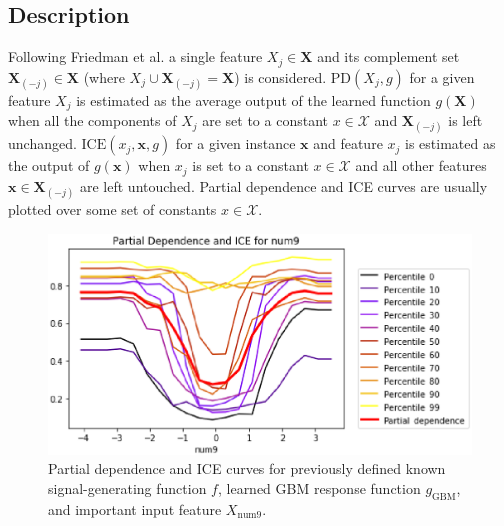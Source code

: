 \documentclass[sigconf, review]{acmart}
\begin{document}
\subsection{Description}
	
Following Friedman et al. a single feature $X_j \in \mathbf{X}$ and its complement set $\mathbf{X}_{(-j)} \in \mathbf{X}$ (where $X_j \cup \mathbf{X}_{(-j)} = \mathbf{X}$) is considered. $\text{PD}(X_j, g)$ for a given feature $X_j$ is estimated as the average output of the learned function $g(\mathbf{X})$ when all the components of $X_j$ are set to a constant $x \in \mathcal{X}$ and $\mathbf{X}_{(-j)}$ is left unchanged. $\text{ICE}(x_j, \mathbf{x}, g)$ for a given instance $\mathbf{x}$ and feature $x_j$ is estimated as the output of $g(\mathbf{x})$ when $x_j$ is set to a constant $x \in \mathcal{X}$ and all other features $\mathbf{x} \in \mathbf{X}_{(-j)}$ are left untouched. Partial dependence and ICE curves are usually plotted over some set of constants $x \in \mathcal{X}$. 

\begin{figure}[htb]
	\begin{center}
		\includegraphics[scale=0.45]{img/figure_4.eps}
		\caption{Partial dependence and ICE curves for previously defined known signal-generating function $f$,  learned GBM response function $g_{\text{GBM}}$, and important input feature $X_{\text{num}9}$.}
		\label{fig:pdp_ice}
	\end{center}
\end{figure}
\end{document}
